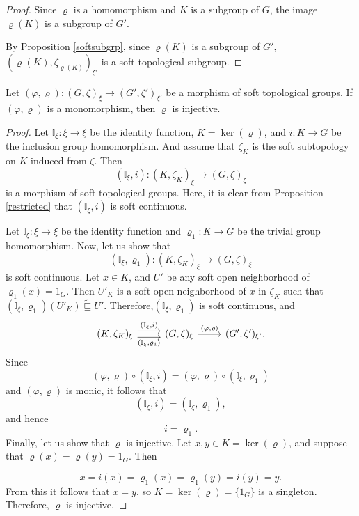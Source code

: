 \documentclass[preprint,12pt]{elsarticle}
\begin{document}
\begin{proof}
 Since  $\varrho$ is a homomorphism and $K$ is a subgroup of  $G$, the image $\varrho(K)$ is a subgroup of $G'$.

 By Proposition \ref{softsubgrp}, since $\varrho(K)$ is a subgroup of $G'$,
$ (\varrho(K),\zeta_{\varrho(K)})_{\xi'} $ is a soft topological subgroup.
\end{proof}
\begin{prop}
Let  $(\varphi, \varrho) : (G,\zeta)_\xi  \to ( G',\zeta')_{\xi'}$  be a  morphism of soft topological groups.
If $(\varphi, \varrho)$ is a monomorphism, then $\varrho$ is injective.
\end{prop}
\begin{proof}
Let $\mathbb{I}_\xi : \xi \to \xi$ be the identity function, $K = \ker(\varrho)$,  and $i : K \to G$ be the inclusion group homomorphism.  And assume that $\zeta_K$ is the soft subtopology on $K$ induced from $\zeta$.
Then
\[
(\mathbb{I}_\xi, i) : (K,\zeta_K)_\xi\rightarrow (G,\zeta)_\xi
\]
is a morphism of soft topological groups. Here, it is clear from Proposition \ref{restricted} that $(\mathbb{I}_\xi, i)$ is soft continuous.


Let  \(\mathbb{I}_\xi : \xi \to \xi\) be the identity function and \(\varrho_1 : K \to G\) be the trivial group homomorphism.
Now, let us show that
\[(\mathbb{I}_\xi, \varrho_1) :  (K,\zeta_K)_\xi\rightarrow (G,\zeta)_\xi\]
is soft continuous.
 Let $x \in K$, and   $U'$ be any soft open neighborhood of  $\varrho_1(x)=1_G$. Then    $U'_K  $ is a soft open neighborhood of  $x$  in  $ \zeta_K$  such that  $(\mathbb{I}_\xi, \varrho_1)(U'_K) \widetilde{\sqsubseteq} U'$.
Therefore,$(\mathbb{I}_\xi, \varrho_1)$ is soft continuous, and
\[
\begin{tikzcd}
(K,\zeta_K)_\xi \ar[r,shift left=.75ex,"{(\mathbb{I}_\xi, i)}"]
  \ar[r,shift right=.75ex,swap,"{(\mathbb{I}_\xi, \varrho_1 )}"]
&(G,\zeta)_\xi  \ar[r,"{(\varphi, \varrho)}"]
& ( G',\zeta')_{\xi'} .
\end{tikzcd}
\]
Since
\[
(\varphi, \varrho) \circ (\mathbb{I}_{\xi}, i) = (\varphi, \varrho) \circ (\mathbb{I}_{\xi}, \varrho_1)
\]
and \((\varphi, \varrho)\) is monic, it follows that
\[
(\mathbb{I}_{\xi}, i) = (\mathbb{I}_{\xi}, \varrho_1),
\]
and hence
\[
i =\varrho_1.
\]
Finally, let us show that \( \varrho \) is injective. Let \( x, y \in K = \ker(\varrho) \), and suppose that \( \varrho(x) = \varrho(y)=1_G \). Then



\[
x=i(x) = \varrho_1(x)=\varrho_1(y)=i(y)=y.
\]
From this it follows that \( x = y \), so \( K = \ker(\varrho) = \{ 1_G \} \) is a singleton. Therefore, \( \varrho \) is injective.
\end{proof}
\end{document}
